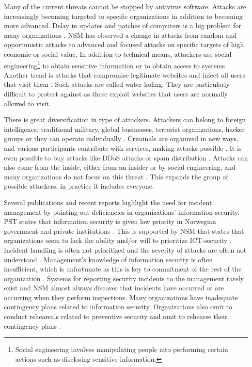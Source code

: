 Many of the current threats cannot be stopped by antivirus software. Attacks are increasingly becoming targeted to specific organizations in addition to becoming more advanced. Delay in updates and patches of computers is a big problem for many organizations \cite{NorCERT2Kvartal2012}. \acs{NSM} has observed a change in attacks from random and opportunistic attacks to advanced and focused attacks on specific targets of high economic or social value. In addition to technical means, attackers use social engineering\footnote{Social engineering involves manipulating people into performing certain actions such as disclosing sensitive information.} to obtain sensitive information or to obtain access to systems \cite{NSMRapport}. Another trend is attacks that compromise legitimate websites and infect all users that visit them \cite{NSMRapport2012}. Such attacks are called water-holing. They are particularly difficult to protect against as these exploit websites that users are normally allowed to visit.

There is great diversification in type of attackers. Attackers can belong to foreign intelligence, traditional military, global businesses, terrorist organizations, hacker groups or they can operate individually \cite{samordnaVurdering}. Criminals are organized in new ways, and various participants contribute with services, making attacks possible \cite{KriposTrender}. It is even possible to buy attacks like \ac{DDoS} attacks or spam distribution \cite{NorCERT2Kvartal2012}. Attacks can also come from the inside, either from an insider or by social engineering, and many organizations do not focus on this threat \cite{NSMRapport2012}. This expands the group of possible attackers, in practice it includes everyone. 

Several publications and recent reports highlight the need for incident management by pointing out deficiencies in organizations' information security. PST states that information security is given low priority in Norwegian government and private institutions \cite{PSTvurdering}. This is supported by \acs{NSM} that states that organizations seem to lack the ability and/or will to prioritize ICT-security \cite{NSMmelding}. Incident handling is often not prioritized and the severity of attacks are often not understood \cite{NorCERT2Kvartal2012}. Management's knowledge of information security is often insufficient, which is unfortunate as this is key to commitment of the rest of the organization \cite{NorCERT3Kvartal2012}. Systems for reporting security incidents to the management rarely exist and \acs{NSM} almost always discover that incidents have occurred or are occurring when they perform inspections\cite{NSMRapport}. Many organizations have inadequate contingency plans related to information security. Organizations also omit to conduct rehearsals related to preventive security and omit to rehearse their contingency plans \cite{NSMRapport2012}.

